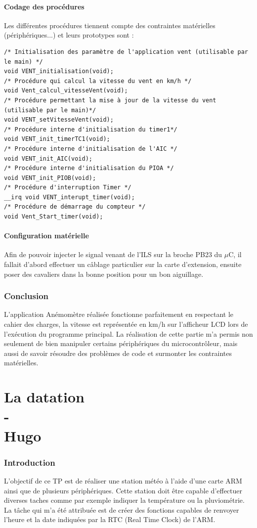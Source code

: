 \documentclass[a4paper]{report}
\begin{document}
\subsection{Codage des procédures}
Les différentes procédures tiennent compte des contraintes matérielles (périphériques...) et leurs prototypes sont :
\begin{verbatim}
/* Initialisation des paramètre de l'application vent (utilisable par le main) */
void VENT_initialisation(void);
/* Procédure qui calcul la vitesse du vent en km/h */
void Vent_calcul_vitesseVent(void);
/* Procédure permettant la mise à jour de la vitesse du vent (utilisable par le main)*/
void VENT_setVitesseVent(void);
/* Procédure interne d'initialisation du timer1*/
void VENT_init_timerTC1(void);
/* Procédure interne d'initialisation de l'AIC */
void VENT_init_AIC(void);
/* Procédure interne d'initialisation du PIOA */
void VENT_init_PIOB(void);
/* Procédure d'interruption Timer */
__irq void VENT_interupt_timer(void);
/* Procédure de démarrage du compteur */
void Vent_Start_timer(void);
\end{verbatim}

\subsection{Configuration matérielle}
Afin de pouvoir injecter le signal venant de l'ILS sur la broche PB23 du $\mu$C, il fallait d'abord effectuer un câblage particulier sur la carte d’extension, ensuite poser des cavaliers dans la bonne position pour un bon aiguillage.

\section{Conclusion}
L'application Anémomètre réalisée fonctionne parfaitement en respectant le cahier des charges, la vitesse est représentée en km/h sur l'afficheur LCD lors de l’exécution du programme principal.
La réalisation de cette partie m'a permis non seulement de bien manipuler certains périphériques du microcontrôleur, mais aussi de savoir résoudre des problèmes de code et surmonter les contraintes matérielles.


\part{La datation\\-\\Hugo {}}
\section{Introduction}
L'objectif de ce TP est de réaliser une station météo à l'aide d'une carte ARM ainsi que de plusieurs périphériques.
Cette station doit être capable d'effectuer diverses taches comme par exemple indiquer la température ou la pluviométrie.
La tâche qui m'a été attribuée est de créer des fonctions capables de renvoyer l'heure et la date indiquées par la RTC (Real Time Clock) de l'ARM.
\end{document}
